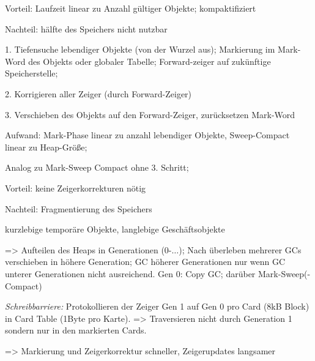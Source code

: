 Vorteil: Laufzeit linear zu Anzahl gültiger Objekte; kompaktifiziert

Nachteil: hälfte des Speichers nicht nutzbar


1. Tiefensuche lebendiger Objekte (von der Wurzel aus); Markierung im Mark-Word des Objekts oder globaler Tabelle; Forward-zeiger auf zukünftige Speicherstelle;

2. Korrigieren aller Zeiger (durch Forward-Zeiger)

3. Verschieben des Objekts auf den Forward-Zeiger, zurücksetzen Mark-Word 

Aufwand: Mark-Phase linear zu anzahl lebendiger Objekte, Sweep-Compact linear zu Heap-Größe;

Analog zu Mark-Sweep Compact ohne 3. Schritt; 

Vorteil: keine Zeigerkorrekturen nötig

Nachteil: Fragmentierung des Speichers

kurzlebige temporäre Objekte, langlebige Geschäftsobjekte

=> Aufteilen des Heaps in Generationen (0-$\dots$); Nach überleben mehrerer GCs verschieben in höhere Generation; GC höherer Generationen nur wenn GC unterer Generationen nicht ausreichend. Gen 0: Copy GC; darüber Mark-Sweep(-Compact)

\textit{Schreibbarriere:} Protokollieren der Zeiger Gen 1 auf Gen 0 pro Card (8kB Block) in Card Table (1Byte pro Karte). => Traversieren nicht durch Generation 1 sondern nur in den markierten Cards. 

=> Markierung und Zeigerkorrektur schneller, Zeigerupdates langsamer


